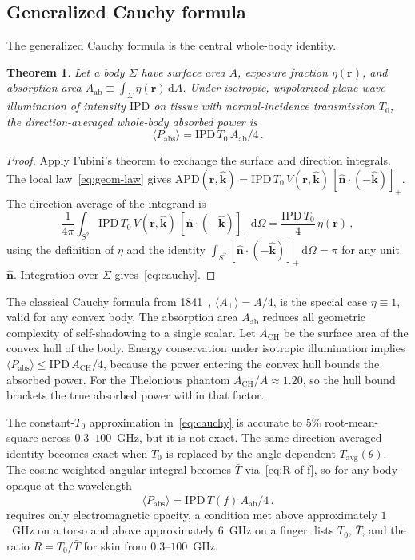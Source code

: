 \documentclass[journal,twocolumn,10pt]{IEEEtran}
\theoremstyle{plain}
\newtheorem{theorem}{Theorem}
\newcommand{\khat}{\hat{\bm{k}}}
\newcommand{\nhat}{\hat{\bm{n}}}
\newcommand{\rr}{\mathbf{r}}
\newcommand{\IPD}{\mathrm{IPD}}
\newcommand{\APD}{\mathrm{APD}}
\newcommand{\Aab}{A_{\mathrm{ab}}}
\newcommand{\Aperp}{A_\perp}
\newcommand{\Tavg}{T_{\mathrm{avg}}}
\newcommand{\Tbar}{\bar{T}}
\newcommand{\diff}{\mathrm{d}}
\newcommand{\pospart}[1]{\left[#1\right]_{+}}
\newcommand{\Vis}{V}
\begin{document}
\subsection{Generalized Cauchy formula}\label{subsec:cauchy-thm}

The generalized Cauchy formula is the central whole-body identity.
\begin{theorem}\label{thm:cauchy}
Let a body $\Sigma$ have surface area $A$, exposure fraction
$\eta(\rr)$, and absorption area
$\Aab \equiv \int_\Sigma \eta(\rr)\,\diff A$. Under isotropic,
unpolarized plane-wave illumination of intensity $\IPD$ on tissue
with normal-incidence transmission $T_0$, the direction-averaged
whole-body absorbed power is
\begin{equation}\label{eq:cauchy}
  \langle P_{\mathrm{abs}} \rangle = \IPD\,T_0\,\Aab/4\, .
\end{equation}
\end{theorem}

\begin{proof}
Apply Fubini's theorem to exchange the surface and direction
integrals. The local law~\eqref{eq:geom-law} gives
$\APD(\rr,\khat) = \IPD\,T_0\,\Vis(\rr,\khat)\,
\pospart{\nhat\cdot(-\khat)}$. The direction average of the integrand
is
\[
  \frac{1}{4\pi}\int_{S^2}
  \IPD\,T_0\,\Vis(\rr,\khat)\,\pospart{\nhat\cdot(-\khat)}\,
  \diff\Omega
  = \frac{\IPD\,T_0}{4}\,\eta(\rr)\,,
\]
using the definition of $\eta$ and the identity $\int_{S^2}
\pospart{\nhat\cdot(-\khat)}\,\diff\Omega = \pi$ for any unit
$\nhat$. Integration over $\Sigma$ gives~\eqref{eq:cauchy}.
\end{proof}

The classical Cauchy formula from 1841~\cite{Cauchy1841},
$\langle\Aperp\rangle = A/4$, is the special case $\eta \equiv 1$,
valid for any convex body. The
absorption area $\Aab$ reduces all geometric complexity of
self-shadowing to a single scalar. Let $A_{\mathrm{CH}}$ be the
surface area of the convex hull of the body. Energy conservation under
isotropic illumination implies
$\langle P_{\mathrm{abs}} \rangle \le \IPD\,A_{\mathrm{CH}}/4$, because
the power entering the convex hull bounds the absorbed power. For the
Thelonious phantom $A_{\mathrm{CH}}/A \approx 1.20$, so the hull bound
brackets the true absorbed power within that factor.

The constant-$T_0$ approximation in~\eqref{eq:cauchy} is accurate to
$5\%$ root-mean-square across $0.3$--$100$~GHz, but it is not
exact. The same direction-averaged identity becomes exact when $T_0$
is replaced by the angle-dependent $\Tavg(\theta)$. The
cosine-weighted angular integral becomes $\Tbar$
via~\eqref{eq:R-of-f}, so for any body opaque at the wavelength
\begin{equation}\label{eq:cauchy-exact}
  \langle P_{\mathrm{abs}} \rangle = \IPD\,\Tbar(f)\,\Aab/4 \,.
\end{equation}
 requires only electromagnetic opacity, a
condition met above approximately $1$~GHz on a torso and above
approximately $6$~GHz on a finger.  lists $T_0$,
$\Tbar$, and the ratio $R = T_0/\Tbar$ for skin from $0.3$--$100$~GHz.
\end{document}
